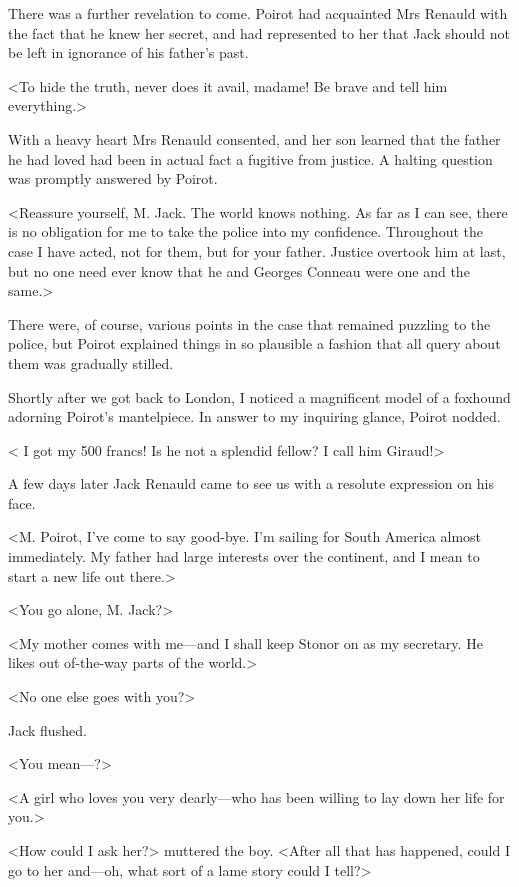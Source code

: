  There was a further revelation to come. Poirot had acquainted Mrs Renauld with the fact that he knew her secret, and had represented to her that Jack should not be left in ignorance of his father's past. 

 <To hide the truth, never does it avail, madame! Be brave and tell him everything.> 

 With a heavy heart Mrs Renauld consented, and her son learned that the father he had loved had been in actual fact a fugitive from justice. A halting question was promptly answered by Poirot. 

 <Reassure yourself, M. Jack. The world knows nothing. As far as I can see, there is no obligation for me to take the police into my confidence. Throughout the case I have acted, not for them, but for your father. Justice overtook him at last, but no one need ever know that he and Georges Conneau were one and the same.> 

 There were, of course, various points in the case that remained puzzling to the police, but Poirot explained things in so plausible a fashion that all query about them was gradually stilled. 

 Shortly after we got back to London, I noticed a magnificent model of a foxhound adorning Poirot's mantelpiece. In answer to my inquiring glance, Poirot nodded. 

 < I got my 500 francs! Is he not a splendid fellow? I call him Giraud!> 

 A few days later Jack Renauld came to see us with a resolute expression on his face. 

 <M. Poirot, I've come to say good-bye. I'm sailing for South America almost immediately. My father had large interests over the continent, and I mean to start a new life out there.> 

 <You go alone, M. Jack?> 

 <My mother comes with me—and I shall keep Stonor on as my secretary. He likes out of-the-way parts of the world.> 

 <No one else goes with you?> 

 Jack flushed. 

 <You mean—?> 

 <A girl who loves you very dearly—who has been willing to lay down her life for you.> 

 <How could I ask her?> muttered the boy. <After all that has happened, could I go to her and—oh, what sort of a lame story could I tell?> 

